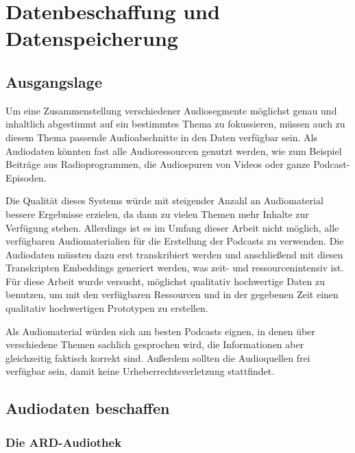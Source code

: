 \chapter{Datenbeschaffung und Datenspeicherung}\label{ch:data}

\section{Ausgangslage}

Um eine Zusammenstellung verschiedener Audiosegmente möglichst genau und inhaltlich abgestimmt auf ein bestimmtes Thema zu fokussieren, müssen auch zu diesem Thema passende Audioabschnitte in den Daten verfügbar sein.
Als Audiodaten könnten fast alle Audioressourcen genutzt werden, wie zum Beispiel Beiträge aus Radioprogrammen, die Audiospuren von Videos oder ganze Podcast-Episoden.

Die Qualität dieses Systems würde mit steigender Anzahl an Audiomaterial bessere Ergebnisse erzielen, da dann zu vielen Themen mehr Inhalte zur Verfügung stehen.
Allerdings ist es im Umfang dieser Arbeit nicht möglich, alle verfügbaren Audiomaterialien für die Erstellung der Podcasts zu verwenden.
Die Audiodaten müssten dazu erst transkribiert werden und anschließend mit diesen Transkripten Embeddings generiert werden, was zeit- und ressourcenintensiv ist.
Für diese Arbeit wurde versucht, möglichst qualitativ hochwertige Daten zu benutzen, um mit den verfügbaren Ressourcen und in der gegebenen Zeit einen qualitativ hochwertigen Prototypen zu erstellen.

Als Audiomaterial würden sich am besten Podcasts eignen, in denen über verschiedene Themen sachlich gesprochen wird, die Informationen aber gleichzeitig faktisch korrekt sind.
Außerdem sollten die Audioquellen frei verfügbar sein, damit keine Urheberrechtsverletzung stattfindet.

\section{Audiodaten beschaffen}

\subsection{Die ARD-Audiothek}

